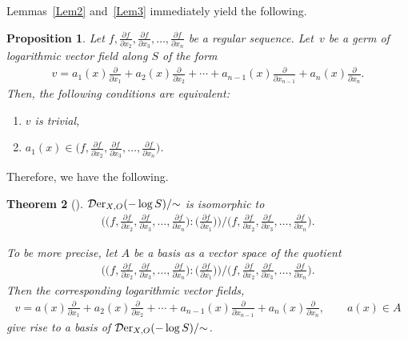 \documentclass[10pt,a4paper]{amsart}
\numberwithin{equation}{section}
\newtheorem{Theorem}{Theorem}[section]
\newtheorem{Proposition}[Theorem]{Proposition}
 { \theoremstyle{definition}
\newtheorem{Definition}[Theorem]{Definition}
\newtheorem{Remark}[Theorem]{Remark}
\newtheorem{Example}[Theorem]{Example}
 }
\begin{document}
Lemmas~\ref{Lem2} and~\ref{Lem3} immediately yield the following.

\begin{Proposition}
Let $f, \frac{\partial f}{\partial x_2}, \frac{\partial f}{\partial x_3}, \ldots,
\frac{\partial f}{\partial x_{n}} $ be a regular sequence. Let~$v$ be a germ of logarithmic
vector field along $S$ of the form
\begin{gather*}
v= {a_1(x)\frac{\partial }{\partial x_1} + a_2(x)\frac{\partial}{\partial x_2} + \cdots +
 a_{n-1}(x)\frac{\partial}{\partial x_{n-1}}+ a_n(x)\frac{\partial}{\partial x_n}}.
\end{gather*}
 Then, the following conditions are equivalent:
\begin{enumerate}\itemsep=0pt
\item[$(i)$] $v$ is trivial,

\item[$(ii)$] $a_1(x) \in \big(f, \frac{\partial f}{\partial x_2}, \frac{\partial f}{\partial x_3},\ldots,\frac{\partial f}{\partial x_{n}}\big)$.
\end{enumerate}
\end{Proposition}

Therefore, we have the following.

\begin{Theorem}[\cite{T}]
$ {\mathcal D}{\rm er}_{X, O}(-\log S)/{\sim} $ is isomorphic to
\begin{gather*}
\bigg(\bigg(f, \frac{\partial f}{\partial x_2}, \frac{\partial f}{\partial x_3},\ldots,\frac{\partial f}{\partial x_{n}}\bigg) : \bigg(\frac{\partial f}{\partial x_1}\bigg)\bigg)\Big/\bigg(f, \frac{\partial f}{\partial x_2}, \frac{\partial f}{\partial x_3},\ldots,\frac{\partial f}{\partial x_{n}}\bigg).
\end{gather*}

To be more precise, let $A$ be a basis as a vector space of the quotient
\begin{gather*}
\bigg(\bigg(f, \frac{\partial f}{\partial x_2}, \frac{\partial f}{\partial x_3},\ldots,\frac{\partial f}{\partial x_{n}}\bigg) : \bigg(\frac{\partial f}{\partial x_1}\bigg)\bigg)\Big/\bigg(f, \frac{\partial f}{\partial x_2}, \frac{\partial f}{\partial x_3},\ldots,\frac{\partial f}{\partial x_{n}}\bigg).
\end{gather*}
Then the corresponding logarithmic vector fields,
\begin{gather*}
v= a(x)\frac{\partial }{\partial x_1} + a_2(x)\frac{\partial}{\partial x_2} + \cdots +a_{n-1}(x)\frac{\partial}{\partial x_{n-1}}+ a_n(x)\frac{\partial}{\partial x_n}, \qquad
a(x) \in A
\end{gather*}
give rise to a basis of $ {\mathcal D}{\rm er}_{X, O}(-\log S)/{\sim}$.

\end{Theorem}
\end{document}
